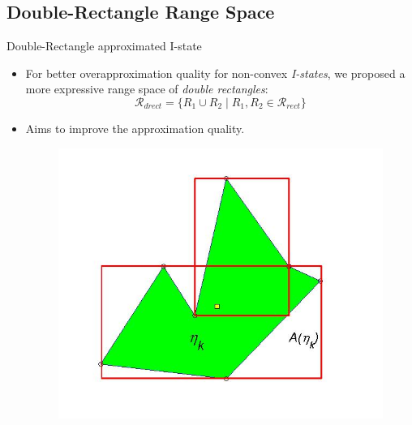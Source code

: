 \subsection[Double-Rectangle Range Space]{Double-Rectangle Range Space}
\begin{frame}{Double-Rectangle approximated I-state}
  \begin{itemize}
  \item For better overapproximation quality for non-convex \emph{I-states},
    we proposed a more expressive range space of \emph{double rectangles}: \\
    \begin{equation}
      \mathcal{R}_{drect} = \{ R_1 \cup R_2 \mid R_1, R_2 \in \mathcal{R}_{rect} \}
    \end{equation}
  \item Aims to improve the approximation quality.
    \begin{figure}
      \includegraphics[scale=0.2]{figs/poly.jpg}
    \end{figure}
  \end{itemize}
\end{frame}
